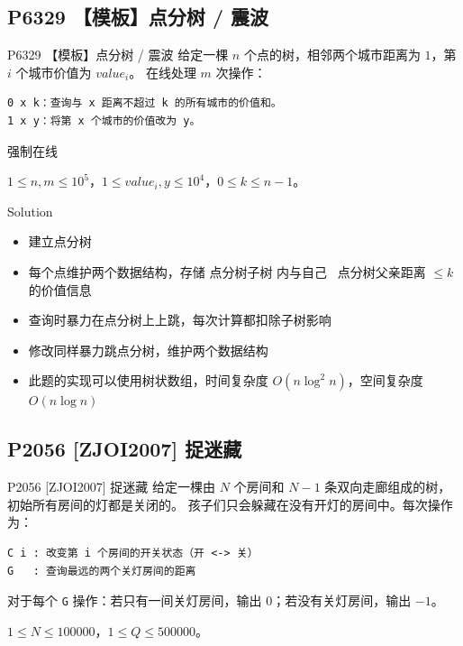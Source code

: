 ﻿\documentclass[aspectratio=169]{ctexbeamer}
\begin{document}
\subsection{P6329 【模板】点分树 / 震波}
\begin{frame}[fragile]{P6329 【模板】点分树 / 震波}
    给定一棵 $n$ 个点的树，相邻两个城市距离为 $1$，第 $i$ 个城市价值为 $value_i$。
    在线处理 $m$ 次操作：
    \begin{verbatim}
0 x k：查询与 x 距离不超过 k 的所有城市的价值和。
1 x y：将第 x 个城市的价值改为 y。
    \end{verbatim}
    强制在线

    \medskip
    $1\le n,m\le 10^5$，$1\le value_i,y\le 10^4$，$0\le k\le n-1$。
\end{frame}

\begin{frame}{Solution}
    \begin{itemize}
        \item 建立点分树
        \item 每个点维护两个数据结构，存储 点分树子树 内与自己 \ 点分树父亲距离 $\le k$ 的价值信息
        \item 查询时暴力在点分树上上跳，每次计算都扣除子树影响
        \item 修改同样暴力跳点分树，维护两个数据结构
        \item 此题的实现可以使用树状数组，时间复杂度 $O(n\log^2n)$，空间复杂度 $O(n\log n)$
    \end{itemize}
\end{frame}

\subsection{P2056 [ZJOI2007] 捉迷藏}
\begin{frame}[fragile]{P2056 [ZJOI2007] 捉迷藏}
    给定一棵由 \(N\) 个房间和 \(N-1\) 条双向走廊组成的树，初始所有房间的灯都是关闭的。
    孩子们只会躲藏在没有开灯的房间中。每次操作为：
    \begin{verbatim}
C i : 改变第 i 个房间的开关状态（开 <-> 关）
G   : 查询最远的两个关灯房间的距离
    \end{verbatim}
    对于每个 \texttt{G} 操作：若只有一间关灯房间，输出 \(0\)；若没有关灯房间，输出 \(-1\)。

    \medskip
    \(1\le N\le 100000\)，\(1\le Q\le 500000\)。
\end{frame}
\end{document}
